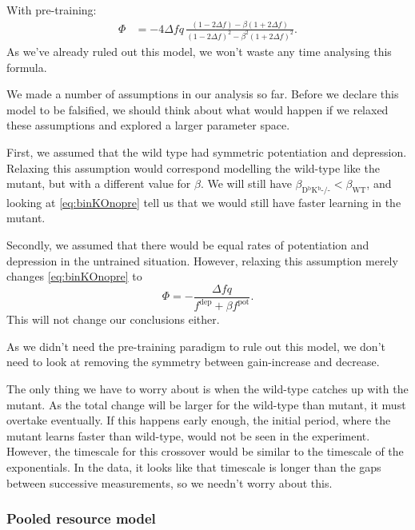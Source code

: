 \documentclass[12pt]{article}
\newcommand{\pot}{^{\text{pot}}}
\newcommand{\dep}{^{\text{dep}}}
\newcommand{\wt}{_{\text{WT}}}
\newcommand{\ko}{_{\text{D$^\mathrm{b}$K$^\mathrm{b}$-/-}}}
\begin{document}
With pre-training:
%
\begin{equation}\label{eq:binKOpre}
\begin{aligned}
  \Phi &= -4\Delta f q \, \frac{(1-2\Delta f) - \beta(1+2\Delta f)}
          {(1-2\Delta f)^2 - \beta^2(1+2\Delta f)^2}.
\end{aligned}
\end{equation}
%
As we've already ruled out this model, we won't waste any time analysing this formula.

We made a number of assumptions in our analysis so far.
Before we declare this model to be falsified, we should think about what would happen if we relaxed these assumptions and explored a larger parameter space.

First, we assumed that the wild type had symmetric potentiation and depression.
Relaxing this assumption would correspond modelling the wild-type like the mutant, but with a different value for $\beta$.
We will still have $\beta\ko<\beta\wt$, and looking at \eqref{eq:binKOnopre} tell us that we would still have faster learning in the mutant.

Secondly, we assumed that there would be equal rates of potentiation and depression in the untrained situation.
However, relaxing this assumption merely changes \eqref{eq:binKOnopre} to
%
\begin{equation}\label{eq:binKOnoprediff}
  \Phi = -\frac{\Delta f q}{f\dep+\beta f\pot}.
\end{equation}
%
This will not change our conclusions either.

As we didn't need the pre-training paradigm to rule out this model, we don't need to look at removing the symmetry between gain-increase and decrease.

The only thing we have to worry about is when the wild-type catches up with the mutant.
As the total change will be larger for the wild-type than mutant, it must overtake eventually.
If this happens early enough, the initial period, where the mutant learns faster than wild-type, would not be seen in the experiment.
However, the timescale for this crossover would be similar to the timescale of the exponentials.
In the data, it looks like that timescale is longer than the gaps between successive measurements, so we needn't worry about this.



\subsubsection{Pooled resource model}\label{sec:pooled}
\end{document}
